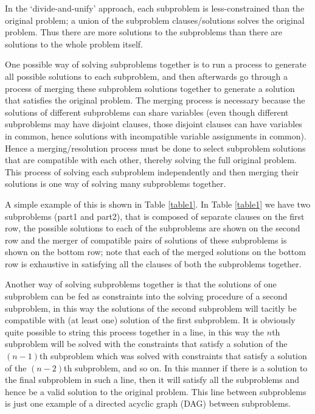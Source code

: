\documentclass[
10pt, %
a4paper, %
oneside, %
headinclude,footinclude, %
BCOR5mm, %
]{scrartcl}
\begin{document}
In the `divide-and-unify' approach, each subproblem is less-constrained than the original problem; a union of the subproblem clauses/solutions solves the original problem. Thus there are more solutions to the subproblems than there are solutions to the whole problem itself.

One possible way of solving subproblems together is to run a process to generate all possible solutions to each subproblem, and then afterwards go through a process of merging these subproblem solutions
together to generate a solution that satisfies the original problem.
The merging process is necessary because the solutions of different subproblems can share variables (even though different subproblems may have disjoint clauses, 
those disjoint clauses can have variables in common, hence solutions with incompatible variable assignments in common).
Hence a merging/resolution process must be done to select subproblem solutions that are compatible with each other, thereby solving the full original problem.
This process of solving each subproblem independently and then merging their solutions is one way of solving many subproblems together.

A simple example of this is shown in Table \ref{table1}. In Table \ref{table1} we have two subproblems (part1 and part2), that is composed of separate clauses on the first row, 
the possible solutions to each of the subproblems are shown on the second row and the merger of compatible pairs of solutions of these subproblems is shown on the bottom row; note
that each of the merged solutions on the bottom row is exhaustive in satisfying all the clauses of both the subproblems together.

Another way of solving subproblems together is that the solutions of one subproblem can be fed as constraints into the solving procedure of a second subproblem, 
in this way the solutions of the second subproblem will tacitly be compatible with (at least one) solution of the first subproblem.
It is obviously quite possible to string this process together in a line, in this way the $n$th subproblem will be solved with the constraints that satisfy a solution of the $(n-1)$th 
subproblem which was solved with constraints that satisfy a solution of the $(n-2)$th subproblem, and so on.
In this manner if there is a solution to the final subproblem in such a line, then it will satisfy all the subproblems and hence be a valid solution to the original problem.
This line between subproblems is just one example of a directed acyclic graph (DAG) between subproblems.
\end{document}

